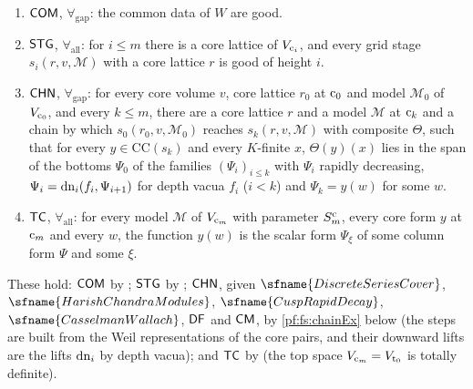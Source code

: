 \begin{definition}\label{pf:fs:corestatements}
\begin{enumerate}[label=(\arabic*)]
\item $\mathsf{COM}$, $\forall_{\mathrm{gap}}$: the common data of $W$ are good.
\item $\mathsf{STG}$, $\forall_{\mathrm{all}}$: for $i\le m$ there is a core lattice of $V_{\mathrm{c}_i}$, and every grid stage
$s_i(r,v,\mathcal M)$ with a core lattice $r$ is good of height $i$.
\item $\mathsf{CHN}$, $\forall_{\mathrm{gap}}$: for every core volume $v$, core lattice $r_0$ at $\mathrm{c}_0$ and model $\mathcal M_0$ of
$V_{\mathrm{c}_0}$, and every $k\le m$, there are a core lattice $r$ and a model $\mathcal M$ at $\mathrm{c}_k$ and a chain by which
$s_0(r_0,v,\mathcal M_0)$ reaches $s_k(r,v,\mathcal M)$ with composite $\Theta$, such that for every $y\in\mathrm{CC}(s_k)$ and every
$K$-finite $x$, $\Theta(y)(x)$ lies in the span of the bottoms $\Psi_0$ of the families $(\Psi_i)_{i\le k}$ with $\Psi_i$ rapidly
decreasing, $\Psi_i=\mathrm{dn}_i(f_i,\Psi_{i+1})$ for depth vacua $f_i$ ($i<k$) and $\Psi_k=y(w)$ for some $w$.
\item $\mathsf{TC}$, $\forall_{\mathrm{all}}$: for every model $\mathcal M$ of $V_{\mathrm{c}_m}$ with parameter $S^{\mathrm{c}}_m$, every core form
$y$ at $\mathrm{c}_m$ and every $w$, the function $y(w)$ is the scalar form $\Psi_\xi$ of some column form $\Psi$ and some $\xi$.
\end{enumerate}
\end{definition}

These hold: $\mathsf{COM}$ by ; $\mathsf{STG}$ by
; $\mathsf{CHN}$, given $\sfname{DiscreteSeriesCover}$,
$\sfname{HarishChandraModules}$, $\sfname{CuspRapidDecay}$, $\sfname{CasselmanWallach}$, $\mathsf{DF}$ and $\mathsf{CM}$, by \cref{pf:fs:chainEx} below
(the steps are built from the Weil representations of the core pairs, and their downward lifts are the lifts $\mathrm{dn}_i$ by depth vacua); and
$\mathsf{TC}$ by  (the top space $V_{\mathrm{c}_m}=V_{\mathrm{t}_0}$ is totally definite).

